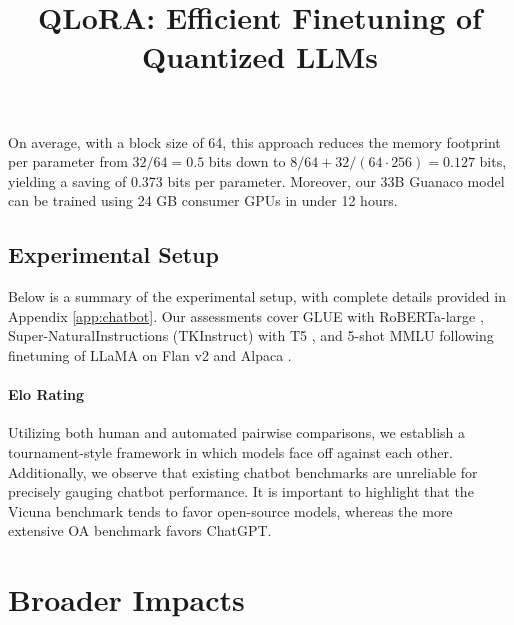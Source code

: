 \title{QLoRA: Efficient Finetuning of Quantized LLMs}
On average, with a block size of 64, this approach reduces the memory footprint per parameter from $32/64=0.5$ bits down to $8/64 + 32/(64\cdot256) = 0.127$ bits, yielding a saving of 0.373 bits per parameter. Moreover, our 33B {Guanaco} model can be trained using 24 GB consumer GPUs in under 12 hours. \subsection{Experimental Setup} Below is a summary of the experimental setup, with complete details provided in Appendix \ref{app:chatbot}. Our assessments cover GLUE \citep{wang2018glue} with RoBERTa-large \citep{liu2019roberta}, Super-NaturalInstructions (TKInstruct) \citep{wang2022super} with T5 \citep{t5}, and 5-shot MMLU \citep{hendrycksmeasuring} following finetuning of LLaMA on Flan v2 \citep{longpre2023flan} and Alpaca \citep{alpaca}. \paragraph{Elo Rating} Utilizing both human and automated pairwise comparisons, we establish a tournament-style framework in which models face off against each other. Additionally, we observe that existing chatbot benchmarks are unreliable for precisely gauging chatbot performance. It is important to highlight that the Vicuna benchmark tends to favor open-source models, whereas the more extensive OA benchmark favors ChatGPT. \section{Broader Impacts}

